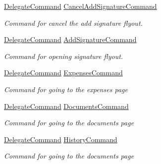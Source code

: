 \begin{DoxyCompactItemize}
\hyperlink{class_delegate_command}{Delegate\+Command} \hyperlink{class_field_service_1_1_win_r_t_1_1_view_models_1_1_assignment_view_model_a476a0faa45bcc30847ecc06f61a75c30}{Cancel\+Add\+Signature\+Command}
\begin{DoxyCompactList}\small\item\em Command for cancel the add signature flyout. \end{DoxyCompactList}\item 
\hyperlink{class_delegate_command}{Delegate\+Command} \hyperlink{class_field_service_1_1_win_r_t_1_1_view_models_1_1_assignment_view_model_a64bdafef9f7ee7ae904f77710703baf6}{Add\+Signature\+Command}
\begin{DoxyCompactList}\small\item\em Command for opening signature flyout. \end{DoxyCompactList}\item 
\hyperlink{class_delegate_command}{Delegate\+Command} \hyperlink{class_field_service_1_1_win_r_t_1_1_view_models_1_1_assignment_view_model_a9e13b6bb8889b005d66b232e79f6465b}{Expenses\+Command}
\begin{DoxyCompactList}\small\item\em Command for going to the expenses page \end{DoxyCompactList}\item 
\hyperlink{class_delegate_command}{Delegate\+Command} \hyperlink{class_field_service_1_1_win_r_t_1_1_view_models_1_1_assignment_view_model_a1785caf2829e97153420d2f0e1125d4d}{Documents\+Command}
\begin{DoxyCompactList}\small\item\em Command for going to the documents page \end{DoxyCompactList}\item 
\hyperlink{class_delegate_command}{Delegate\+Command} \hyperlink{class_field_service_1_1_win_r_t_1_1_view_models_1_1_assignment_view_model_ac42bedfb14197608e1103435ebe16524}{History\+Command}
\begin{DoxyCompactList}\small\item\em Command for going to the documents page \end{DoxyCompactList}\item 

\end{DoxyCompactItemize}
